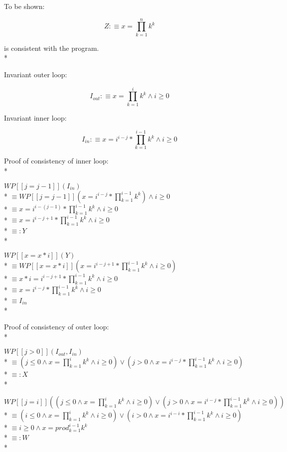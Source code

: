 \documentclass{article}
\begin{document}
To be shown:

$$ Z:\equiv x=\prod_{k=1}^{n} k^k $$

is consistent with the program. \\*

Invariant outer loop:

$$ I_{out}:\equiv x=\prod_{k=1}^{i} k^k \land i \ge 0 $$

Invariant inner loop:

$$ I_{in}:\equiv x=i^{i-j}*\prod_{k=1}^{i-1} k^k \land i \ge 0 $$

Proof of consistency of inner loop: \\*

$ WP[\![j=j-1]\!](I_{in}) $ \\*
$ \equiv WP[\![j=j-1]\!](x=i^{i-j}*\prod_{k=1}^{i-1} k^k) \land i \ge 0 $ \\*
$ \equiv x=i^{i-(j-1)}*\prod_{k=1}^{i-1} k^k \land i \ge 0 $ \\*
$ \equiv x=i^{i-j+1}*\prod_{k=1}^{i-1} k^k \land i \ge 0 $ \\*
$ \equiv: Y $ \\*

$ WP[\![x=x*i]\!](Y) $ \\*
$ \equiv WP[\![x=x*i]\!](x=i^{i-j+1}*\prod_{k=1}^{i-1} k^k \land i \ge 0) $ \\*
$ \equiv x*i=i^{i-j+1}*\prod_{k=1}^{i-1} k^k \land i \ge 0 $ \\*
$ \equiv x=i^{i-j}*\prod_{k=1}^{i-1} k^k \land i \ge 0 $ \\*
$ \equiv I_{in} $ \\*

Proof of consistency of outer loop: \\*

$ WP[\![j>0]\!](I_{out}, I_{in}) $ \\*
$ \equiv (j\le 0 \land x=\prod_{k=1}^{i} k^k \land i \ge 0) \lor (j>0 \land x=i^{i-j}*\prod_{k=1}^{i-1} k^k \land i \ge 0) $ \\*
$ \equiv: X $ \\*

$ WP[\![j=i]\!]((j\le 0 \land x=\prod_{k=1}^{i} k^k \land i \ge 0) \lor (j>0 \land x=i^{i-j}*\prod_{k=1}^{i-1} k^k \land i \ge 0)) $ \\*
$ \equiv (i\le 0 \land x=\prod_{k=1}^{i} k^k \land i \ge 0) \lor (i>0 \land x=i^{i-i}*\prod_{k=1}^{i-1} k^k \land i \ge 0) $ \\*
$ \equiv i\ge 0 \land x=prod_{k=1}^{i-1} k^k $ \\*
$ \equiv:W $ \\*
\end{document}
